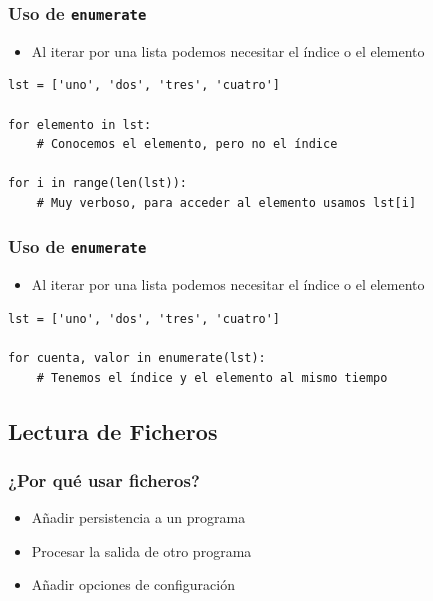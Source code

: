 \documentclass[11pt]{beamer}
\begin{document}
\begin{frame}[fragile]\frametitle{Uso de \texttt{enumerate}}
\begin{itemize}
\item Al iterar por una lista podemos necesitar el índice o el elemento
\end{itemize}
\begin{lstlisting}
lst = ['uno', 'dos', 'tres', 'cuatro']

for elemento in lst:
    # Conocemos el elemento, pero no el índice

for i in range(len(lst)):
    # Muy verboso, para acceder al elemento usamos lst[i]
\end{lstlisting}
\end{frame}

\begin{frame}[fragile]\frametitle{Uso de \texttt{enumerate}}
\begin{itemize}
\item Al iterar por una lista podemos necesitar el índice o el elemento
\end{itemize}
\begin{lstlisting}
lst = ['uno', 'dos', 'tres', 'cuatro']

for cuenta, valor in enumerate(lst):
    # Tenemos el índice y el elemento al mismo tiempo
\end{lstlisting}
\end{frame}


\subsection{Lectura de Ficheros}

\begin{frame}\frametitle{¿Por qué usar ficheros?}
\begin{itemize}
\item Añadir persistencia a un programa
\item Procesar la salida de otro programa
\item Añadir opciones de configuración
\end{itemize}

\end{frame}
\end{document}
